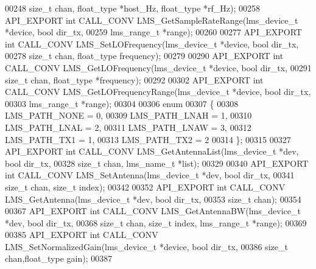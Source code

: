 \begin{DoxyCode}
00248                            \textcolor{keywordtype}{size\_t} chan, float\_type *host_Hz, float\_type *rf_Hz);
00258 API_EXPORT \textcolor{keywordtype}{int} CALL_CONV LMS_GetSampleRateRange(lms\_device\_t *device, \textcolor{keywordtype}{bool} 
      dir_tx,
00259                                                 lms_range_t *range);
00260 
00277 API_EXPORT \textcolor{keywordtype}{int} CALL_CONV LMS_SetLOFrequency(lms\_device\_t *device, \textcolor{keywordtype}{bool} dir_tx,
00278                                             \textcolor{keywordtype}{size\_t} chan, float\_type frequency);
00279 
00290 API_EXPORT \textcolor{keywordtype}{int} CALL_CONV LMS_GetLOFrequency(lms\_device\_t *device, \textcolor{keywordtype}{bool} dir_tx,
00291                                             \textcolor{keywordtype}{size\_t} chan, float\_type *frequency);
00292 
00302 API_EXPORT \textcolor{keywordtype}{int} CALL_CONV LMS_GetLOFrequencyRange(lms\_device\_t *device, \textcolor{keywordtype}{bool} 
      dir_tx,
00303                                                  lms_range_t *range);
00304 
00306 \textcolor{keyword}{enum}
00307 \{
00308     LMS_PATH_NONE = 0, 
00309     LMS_PATH_LNAH = 1, 
00310     LMS_PATH_LNAL = 2, 
00311     LMS_PATH_LNAW = 3, 
00312     LMS_PATH_TX1 = 1,  
00313     LMS_PATH_TX2 = 2   
00314 \};
00315 
00327 API_EXPORT \textcolor{keywordtype}{int} CALL_CONV LMS_GetAntennaList(lms\_device\_t *dev, \textcolor{keywordtype}{bool} dir_tx,
00328                                             \textcolor{keywordtype}{size\_t} chan, lms\_name\_t *list);
00329 
00340 API_EXPORT \textcolor{keywordtype}{int} CALL_CONV LMS_SetAntenna(lms\_device\_t *dev, \textcolor{keywordtype}{bool} dir_tx,
00341                                         \textcolor{keywordtype}{size\_t} chan, \textcolor{keywordtype}{size\_t} index);
00342 
00352 API_EXPORT \textcolor{keywordtype}{int} CALL_CONV LMS_GetAntenna(lms\_device\_t *dev, \textcolor{keywordtype}{bool} dir_tx,
00353                                         \textcolor{keywordtype}{size\_t} chan);
00354 
00367 API_EXPORT \textcolor{keywordtype}{int} CALL_CONV LMS_GetAntennaBW(lms\_device\_t *dev, \textcolor{keywordtype}{bool} dir_tx,
00368                                  \textcolor{keywordtype}{size\_t} chan, \textcolor{keywordtype}{size\_t} index, lms_range_t *range);
00369 
00385 API_EXPORT \textcolor{keywordtype}{int} CALL_CONV LMS_SetNormalizedGain(lms\_device\_t *device, \textcolor{keywordtype}{bool} dir_tx,
00386                                                \textcolor{keywordtype}{size\_t} chan,float\_type gain);
00387 

\end{DoxyCode}
